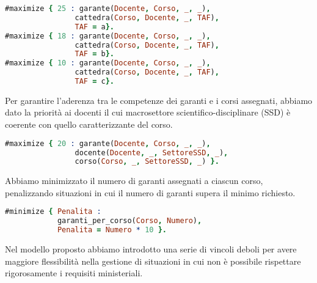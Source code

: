 \begin{lstlisting}[language=prolog, caption=TAF]
#maximize { 25 : garante(Docente, Corso, _, _), 
                cattedra(Corso, Docente, _, TAF), 
                TAF = a}.
#maximize { 18 : garante(Docente, Corso, _, _), 
                cattedra(Corso, Docente, _, TAF), 
                TAF = b}.
#maximize { 10 : garante(Docente, Corso, _, _), 
                cattedra(Corso, Docente, _, TAF), 
                TAF = c}.
\end{lstlisting}

Per garantire l’aderenza tra le competenze dei garanti e i corsi assegnati,
abbiamo dato la priorità ai docenti il cui macrosettore scientifico-disciplinare (SSD)
è coerente con quello caratterizzante del corso.

\begin{lstlisting}[language=prolog, caption=Garanti con macrosettore coerente a quello del corso.]
% Ottimizzare i garanti con SSD caratterizzante
#maximize { 20 : garante(Docente, Corso, _, _), 
                docente(Docente, _, SettoreSSD, _), 
                corso(Corso, _, SettoreSSD, _) }.
\end{lstlisting}

Abbiamo minimizzato il numero di garanti assegnati a ciascun corso, penalizzando
situazioni in cui il numero di garanti supera il minimo richiesto.

\begin{lstlisting}[language=prolog, caption=Minimizzazione dei garanti per corso di laurea.]
% Minimizzo il numero di garanti per ogni corso
#minimize { Penalita : 
            garanti_per_corso(Corso, Numero),
            Penalita = Numero * 10 }.
\end{lstlisting}

Nel modello proposto abbiamo introdotto una serie di vincoli deboli per avere
maggiore flessibilità nella gestione di situazioni in cui non è possibile rispettare
rigorosamente i requisiti ministeriali.

